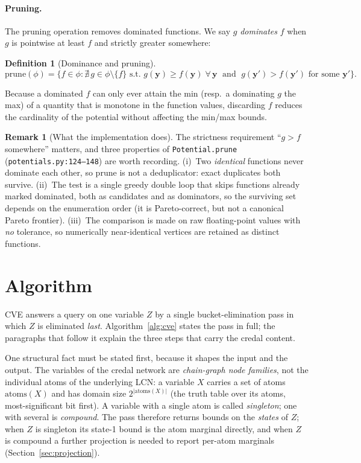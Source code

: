 \documentclass[11pt]{article}
\theoremstyle{definition}
\newtheorem{definition}{Definition}
\newtheorem{remark}{Remark}
\newcommand{\by}{\mathbf{y}}
\newcommand{\prune}{\mathrm{prune}}
\begin{document}
\paragraph{Pruning.}
The pruning operation removes dominated functions. We say $g$ \emph{dominates}
$f$ when $g$ is pointwise at least $f$ and strictly greater somewhere:
\begin{definition}[Dominance and pruning]\label{def:prune}
\[
  \prune(\phi) = \bigl\{f \in \phi : \nexists\, g \in \phi \setminus \{f\}
  \text{ s.t.\ } g(\by) \geq f(\by)\;\forall\, \by
  \;\text{ and }\; g(\by') > f(\by') \text{ for some } \by' \bigr\}.
\]
\end{definition}
Because a dominated $f$ can only ever attain the min (resp.\ a dominating $g$
the max) of a quantity that is monotone in the function values, discarding $f$
reduces the cardinality of the potential without affecting the min/max bounds.

\begin{remark}[What the implementation does]\label{rem:prune}
The strictness requirement ``$g > f$ somewhere'' matters, and three properties of
\texttt{Potential.prune} (\texttt{potentials.py:124--148}) are worth recording.
(i)~Two \emph{identical} functions never dominate each other, so $\prune$ is not
a deduplicator: exact duplicates both survive. (ii)~The test is a single greedy
double loop that skips functions already marked dominated, both as candidates and
as dominators, so the surviving set depends on the enumeration order (it is
Pareto-correct, but not a canonical Pareto frontier). (iii)~The comparison is
made on raw floating-point values with \emph{no} tolerance, so numerically
near-identical vertices are retained as distinct functions.
\end{remark}

\section{Algorithm}
\label{sec:algorithm}

CVE answers a query on one variable $Z$ by a single bucket-elimination pass in
which $Z$ is eliminated \emph{last}. Algorithm~\ref{alg:cve} states the pass in
full; the paragraphs that follow it explain the three steps that carry the credal
content.

One structural fact must be stated first, because it shapes the input and the
output. The variables of the credal network are \emph{chain-graph node families},
not the individual atoms of the underlying LCN: a variable $X$ carries a set of
atoms $\mathrm{atoms}(X)$ and has domain size $2^{|\mathrm{atoms}(X)|}$ (the
truth table over its atoms, most-significant bit first). A variable with a single
atom is called \emph{singleton}; one with several is \emph{compound}. The pass
therefore returns bounds on the \emph{states} of $Z$; when $Z$ is singleton its
state-1 bound is the atom marginal directly, and when $Z$ is compound a further
projection is needed to report per-atom marginals
(Section~\ref{sec:projection}).
\end{document}
